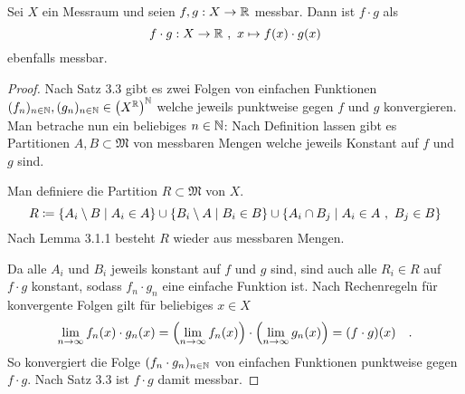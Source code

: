 \documentclass{anablatt}
\begin{document}
\makeheader
\task
\ttask
\begin{theorem}
Sei $X$ ein Messraum und seien $f,g : X \rightarrow \mathbb{R}$ messbar. Dann ist $f \cdot g$ als
\[ f \cdot g: X \rightarrow \mathbb{R} ~,~ x \mapsto f(x) \cdot g(x) \]
ebenfalls messbar.
\end{theorem}
\begin{proof}
Nach Satz 3.3 gibt es zwei Folgen von einfachen Funktionen $(f_n)_{n \in \mathbb{N}}, (g_n)_{n \in \mathbb{N}} \in \qty(X^{\mathbb{R}})^{\mathbb{N}}$ welche jeweils punktweise gegen $f$ und $g$ konvergieren. Man betrache nun ein beliebiges $n \in \mathbb{N}$: Nach Definition lassen gibt es Partitionen $A, B \subset \mathfrak M$ von messbaren Mengen welche jeweils Konstant auf $f$ und $g$ sind.

Man definiere die Partition $R \subset \mathfrak M$ von $X$.
\[
    R \coloneqq \qty{A_i\setminus B \mid A_i \in A} \cup \qty{B_i\setminus A \mid B_i \in B} \cup \qty{A_i \cap B_j \mid A_i \in A~,~ B_j \in B}
\]
Nach Lemma 3.1.1 besteht $R$ wieder aus messbaren Mengen.

Da alle $A_i$ und $B_i$ jeweils konstant auf $f$ und $g$ sind, sind auch alle $R_i \in R$ auf $f \cdot g$ konstant, sodass $f_n \cdot g_n$ eine einfache Funktion ist. Nach Rechenregeln für konvergente Folgen gilt für beliebiges $x \in X$
\[ \lim_{n \rightarrow \infty} f_n(x)\cdot g_n(x) = \qty(\lim_{n \rightarrow \infty}f_n(x)) \cdot \qty (\lim_{n \rightarrow \infty} g_n(x)) = (f \cdot g)(x) \quad.\]
So konvergiert die Folge $(f_n \cdot g_n)_{n\in\mathbb{N}}$ von einfachen Funktionen punktweise gegen $f \cdot g$. Nach Satz 3.3 ist $f \cdot g$ damit messbar.
\end{proof}
\end{document}
